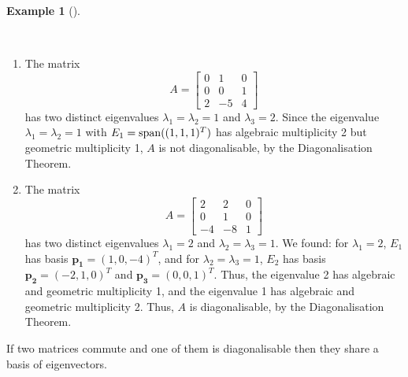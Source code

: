 \documentclass[
  a4paper,
  DIV=11,
  numbers=noendperiod,
  oneside]{scrreprt}
\providecommand{\tightlist}{%
  \setlength{\itemsep}{0pt}\setlength{\parskip}{0pt}}
\theoremstyle{definition}
\newtheorem{example}{Example}[chapter]
\theoremstyle{remark}
\newenvironment{fbxSimple}[3]{\begin{tcolorbox}[enhanced, breakable,%
attach boxed title to top*={xshift=1.4pt},
boxed title style={boxrule=0.0mm, fuzzy shadow={1pt}{-1pt}{0mm}{0.1mm}{gray}, arc=.3em, rounded corners=east, sharp corners=west}, colframe=#1-color2, colbacktitle=#1-color1, colback = white, coltitle=black,  titlerule=0mm, toprule=0pt, bottomrule=.7pt, leftrule=.3em, rightrule=.7pt, outer arc=.3em,  	left=.5em, right=.5em, bottomtitle=1mm, toptitle=1mm,title=\textbf{#2}\hspace{0.5em}{#3}]}
{\end{tcolorbox}}
\begin{document}
\begin{example}[]\protect\hypertarget{exm-}{}\label{exm-}

~

\begin{enumerate}
\def\labelenumi{(\alph{enumi})}
\tightlist
\item
  The matrix \[A = \left[\begin{array}{ccc}
      0 & 1 & 0 \\ 0 & 0 & 1 \\ 2 & -5 & 4 \end{array}\right]\] has two
  distinct eigenvalues \(\lambda _{1} = \lambda _{2} = 1\) and
  \(\lambda _{3} = 2\). Since the eigenvalue
  \(\lambda _{1} = \lambda _{2} = 1\) with
  \(E_{1} = {\rm span}( (1,1,1)^T)\) has algebraic multiplicity 2 but
  geometric multiplicity 1, \(A\) is not diagonalisable, by the
  Diagonalisation Theorem.\\
\item
  The matrix \[A = \left[\begin{array}{ccc}
      2 & 2 & 0 \\ 0 & 1 & 0 \\ -4 & -8 & 1 \end{array}\right]\] has two
  distinct eigenvalues \(\lambda _{1} = 2\) and
  \(\lambda _{2} = \lambda _{3} = 1\). We found: for
  \(\lambda _{1} = 2\), \(E_{1}\) has basis
  \(\mathbf{p_{1}} = (1, 0, -4)^T\), and for
  \(\lambda _{2} = \lambda _{3} = 1\), \(E_{2}\) has basis
  \(\mathbf{p_{2}} = (-2,1, 0)^T\) and \(\mathbf{p_{3}} = (0,0,1)^T\).
  Thus, the eigenvalue 2 has algebraic and geometric multiplicity 1, and
  the eigenvalue 1 has algebraic and geometric multiplicity 2. Thus,
  \(A\) is diagonalisable, by the Diagonalisation Theorem.
\end{enumerate}

\end{example}

\label{joint-eigenbasis}
\begin{fbxSimple}{Theorem}{Theorem 5.16: }{Joint eigenbasis}
\label{joint-eigenbasis}
If two matrices commute and one of them is diagonalisable then they
share a basis of eigenvectors.

\end{fbxSimple}
\end{document}
